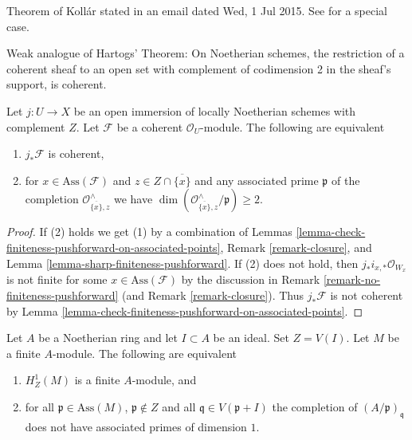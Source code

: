 \begin{proposition}[Koll\'ar]
\label{proposition-kollar}
\begin{reference}
Theorem of Koll\'ar stated in an email dated Wed, 1 Jul 2015.
See \cite[IV, Proposition 7.2.2]{EGA} for a special case.
\end{reference}
\begin{slogan}
Weak analogue of Hartogs' Theorem: On Noetherian schemes, the
restriction of a coherent sheaf to an open set with complement
of codimension 2 in the sheaf's support, is coherent.
\end{slogan}
Let $j : U \to X$ be an open immersion of locally Noetherian schemes
with complement $Z$. Let $\mathcal{F}$ be a coherent $\mathcal{O}_U$-module.
The following are equivalent
\begin{enumerate}
\item $j_*\mathcal{F}$ is coherent,
\item for $x \in \text{Ass}(\mathcal{F})$ and
$z \in Z \cap \overline{\{x\}}$ and any associated prime
$\mathfrak p$ of the completion $\mathcal{O}_{\overline{\{x\}}, z}^\wedge$
we have $\dim(\mathcal{O}_{\overline{\{x\}}, z}^\wedge/\mathfrak p) \geq 2$.
\end{enumerate}
\end{proposition}

\begin{proof}
If (2) holds we get (1) by a combination of
Lemmas \ref{lemma-check-finiteness-pushforward-on-associated-points},
Remark \ref{remark-closure}, and
Lemma \ref{lemma-sharp-finiteness-pushforward}.
If (2) does not hold, then $j_*i_{x, *}\mathcal{O}_{W_x}$ is not finite
for some $x \in \text{Ass}(\mathcal{F})$ by the discussion in
Remark \ref{remark-no-finiteness-pushforward}
(and Remark \ref{remark-closure}).
Thus $j_*\mathcal{F}$ is not coherent by
Lemma \ref{lemma-check-finiteness-pushforward-on-associated-points}.
\end{proof}

\begin{lemma}
\label{lemma-kollar-finiteness-H1-local}
Let $A$ be a Noetherian ring and let $I \subset A$ be an ideal.
Set $Z = V(I)$. Let $M$ be a finite $A$-module. The following
are equivalent
\begin{enumerate}
\item $H^1_Z(M)$ is a finite $A$-module, and
\item for all $\mathfrak p \in \text{Ass}(M)$, $\mathfrak p \not \in Z$
and all $\mathfrak q \in V(\mathfrak p + I)$ the completion of
$(A/\mathfrak p)_\mathfrak q$ does not have associated primes
of dimension $1$.
\end{enumerate}
\end{lemma}

